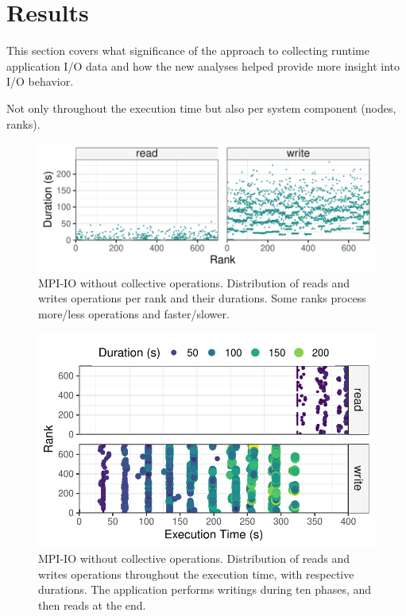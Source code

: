 \section{Results}
\label{sec:results}

This section covers what significance of the approach to collecting runtime application I/O data and how the new analyses helped provide more insight into I/O behavior.

 

Not only throughout the execution time but also per system component
(nodes, ranks).

\begin{figure}
	\centering
        \includegraphics[width=\linewidth]{figs/255653_mpi_io_luster_no_coll_duration_nocolor.pdf}
	\caption{MPI-IO without collective operations. Distribution of reads and writes operations per rank
          and their durations. Some ranks process more/less operations
          and faster/slower.}
	\label{f:mpi_io}
\end{figure}

\begin{figure}
	\centering
	\includegraphics[width=\linewidth]{figs/255653_mpi_io_luster_no_coll_execution2.pdf}
	\caption{MPI-IO without collective operations. Distribution of reads and writes operations
          throughout the execution time, with respective
          durations. The application performs writings during ten
          phases, and then reads at the end.}
	\label{f:mpi_io}
\end{figure}

